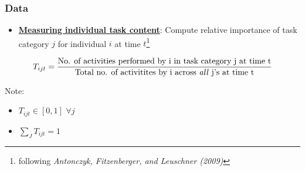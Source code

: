 \documentclass[10pt]{beamer}
\begin{document}
\begin{frame} 
	\frametitle{Data}
	
	
	
	
	\begin{itemize}
		\item \textbf{\underline{Measuring individual task content}}: Compute relative importance of task category $j$ for individual $i$ at time $t$\footnote[frame]{following \textit{Antonczyk, Fitzenberger, and Leuschner (2009)}}  
	\end{itemize}
	
	\medskip
	
	
	\begin{equation} \label{task_def2}
	T_{ijt} = \frac{\text{No. of activities performed by i in task category j at time t}}{\text{Total no. of activitites by i across \textit{all} j's at time t}}
	\end{equation}
	
	\bigskip
	
	
	Note:
	\begin{itemize}
		\item $T_{ijt} \in [0,1]$ $\forall j$\\
		\item $\sum_{J} T_{ijt} = 1$\\
	\end{itemize}
	
\end{frame}
\end{document}
